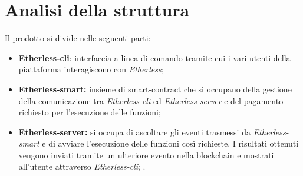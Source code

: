 \section{Analisi della struttura}
Il prodotto si divide nelle seguenti parti: 
\begin{itemize}
	\item \textbf{Etherless-cli}: interfaccia a linea di comando tramite cui i vari utenti della piattaforma interagiscono con \textit{Etherless}; 
	\item \textbf{Etherless-smart:} insieme di smart-contract che si occupano della gestione della comunicazione tra \textit{Etherless-cli} ed \textit{Etherless-server} e del pagamento richiesto per l'esecuzione delle funzioni; 
	\item \textbf{Etherless-server:} si occupa di ascoltare gli eventi trasmessi da \textit{Etherless-smart} e di avviare l'esecuzione delle funzioni così richieste. I risultati ottenuti vengono inviati tramite un ulteriore evento nella blockchain e mostrati all'utente attraverso \textit{Etherless-cli}; .
\end{itemize}

